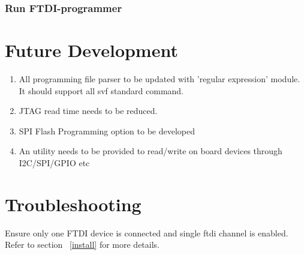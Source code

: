 		\subsubsection{Run FTDI-programmer}
		
		
		
\section{Future Development}
\begin{enumerate}
	\item 
	All programming file parser to be updated with 'regular expression' module. It should support all svf standard command.
	
	\item 
	JTAG read time needs to be reduced.
	
	\item 
	SPI Flash Programming option to be developed
	
	\item 
	An utility needs to be provided to read/write on board devices through I2C/SPI/GPIO etc

\end{enumerate}

\section{Troubleshooting}
Ensure only one FTDI device is connected and single ftdi channel is enabled. Refer to section ~\ref{install} for more details.


